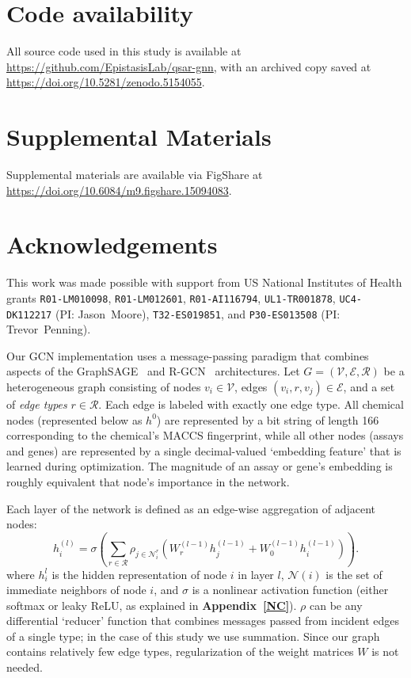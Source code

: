 \documentclass{ws-procs11x85}
\begin{document}
\section{Code availability}
All source code used in this study is available at \url{https://github.com/EpistasisLab/qsar-gnn}, with an archived copy saved at \url{https://doi.org/10.5281/zenodo.5154055}.

\section{Supplemental Materials}
Supplemental materials are available via FigShare at \url{https://doi.org/10.6084/m9.figshare.15094083}.

\section*{Acknowledgements}
This work was made possible with support from US National Institutes of Health grants \texttt{R01-LM010098}, \texttt{R01-LM012601}, \texttt{R01-AI116794}, \texttt{UL1-TR001878}, \texttt{UC4-DK112217} (PI: Jason~Moore), \texttt{T32-ES019851}, and \texttt{P30-ES013508} (PI: Trevor~Penning).

\label{GCN}
Our GCN implementation uses a message-passing paradigm that combines aspects of the GraphSAGE~\cite{hamilton2017inductive} and R-GCN~\cite{schlichtkrull2018modeling} architectures.
Let $G = (\mathcal{V}, \mathcal{E}, \mathcal{R})$ be a heterogeneous graph consisting of nodes $v_i \in \mathcal{V}$, edges $(v_i, r, v_j)\in\mathcal{E}$, and a set of \textit{edge types} $r\in\mathcal{R}$.
Each edge is labeled with exactly one edge type.
All chemical nodes (represented below as $h^0$) are represented by a bit string of length 166 corresponding to the chemical's MACCS fingerprint, while all other nodes (assays and genes) are represented by a single decimal-valued `embedding feature' that is learned during optimization.
The magnitude of an assay or gene's embedding is roughly equivalent that node's importance in the network.

Each layer of the network is defined as an edge-wise aggregation of adjacent nodes:
\begin{equation}
   h_i^{(l)} = \sigma \left(\sum_{r\in\mathcal{R}}\rho_{j\in\mathcal{N}_i^r}\left(W_r^{(l-1)} h_j^{(l-1)} + W_0^{(l-1)} h_i^{(l-1)}\right) \right).\label{eq:a1}
\end{equation}
where $h_i^l$ is the hidden representation of node $i$ in layer $l$, $\mathcal{N}(i)$ is the set of immediate neighbors of node $i$, and $\sigma$ is a nonlinear activation function (either softmax or leaky ReLU, as explained in \textbf{Appendix~\ref{NC}}).
$\rho$ can be any differential `reducer' function that combines messages passed from incident edges of a single type; in the case of this study we use summation.
Since our graph contains relatively few edge types, regularization of the weight matrices $W$ is not needed.
\end{document}
